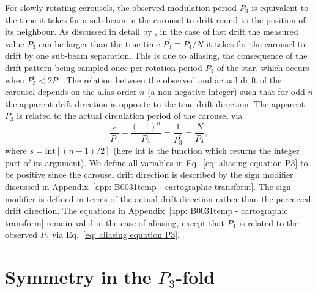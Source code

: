 For slowly rotating carousels, the observed modulation period $P_3$ is equivalent to the time it takes for a sub-beam in the carousel to drift round to the position of its neighbour. As discussed in detail by \citet{GGKS2004}, in the case of fast drift the measured value $P_3$ can be larger than the true time $P_3^t \equiv P_4/N$ it takes for the carousel to drift by one sub-beam separation. This is due to aliasing, the consequence of the drift pattern being sampled once per rotation period $P_1$ of the star, which occurs when $P_3^t < 2P_1$. The relation between the observed and actual drift of the carousel depends on the alias order $n$ (a non-negative integer) such that for odd $n$ the apparent drift direction is opposite to the true drift direction. The apparent $P_3$ is related to the actual circulation period of the carousel via
\begin{equation}
    \label{eq: aliasing equation P3}
    \frac{s}{P_1} + \frac{(-1)^n}{P_3} = \frac{1}{P_3^t} = \frac{N}{P_4},
\end{equation}
where $s = \text{int}[(n+1)/2]$ (here int is the function which returns the integer part of its argument). We define all variables in Eq.~\eqref{eq: aliasing equation P3} to be positive since the carousel drift direction is described by the sign modifier discussed in Appendix~\ref{app: B0031temp - cartographic transform}. The sign modifier is defined in terms of the actual drift direction rather than the perceived drift direction. The equations in Appendix~\ref{app: B0031temp - cartographic transform} remain valid in the case of aliasing, except that $P_4$ is related to the observed $P_3$ via Eq.~\eqref{eq: aliasing equation P3}.


\section{Symmetry in the \texorpdfstring{$P_3$}{P3}-fold}
\label{app: B0031temp - P3-fold symmetry}

